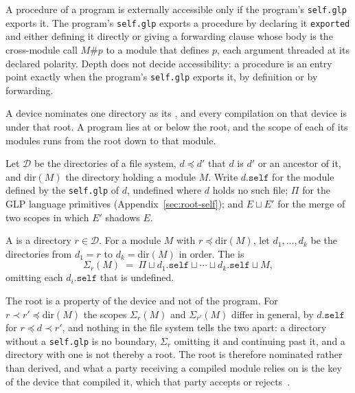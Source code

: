 A procedure of a program is externally accessible only if the program's \verb|self.glp| exports it.  The program's \verb|self.glp| exports a procedure by declaring it \verb|exported| and either defining it directly or giving a forwarding clause whose body is the cross-module call $M\#p$ to a module that defines $p$, each argument threaded at its declared polarity.  Depth does not decide accessibility: a procedure is an entry point exactly when the program's \verb|self.glp| exports it, by definition or by forwarding.

A device nominates one directory as its , and every compilation on that device is under that root.  A program lies at or below the root, and the scope of each of its modules runs from the root down to that module.

\begin{definition}
\label{def:scope}
Let $\mathcal{D}$ be the directories of a file system, $d \preceq d'$ that $d$ is $d'$ or an ancestor of it, and $\mathrm{dir}(M)$ the directory holding a module $M$.  Write $d.\mathtt{self}$ for the module defined by the \verb|self.glp| of $d$, undefined where $d$ holds no such file; $\Pi$ for the GLP language primitives (Appendix~\ref{sec:root-self}); and $E \sqcup E'$ for the merge of two scopes in which $E'$ shadows $E$.

A  is a directory $r \in \mathcal{D}$.  For a module $M$ with $r \preceq \mathrm{dir}(M)$, let $d_1,\ldots,d_k$ be the directories from $d_1 = r$ to $d_k = \mathrm{dir}(M)$ in order.  The  is
\[
  \Sigma_r(M) \;=\; \Pi \sqcup d_1.\mathtt{self} \sqcup \cdots \sqcup d_k.\mathtt{self} \sqcup M,
\]
omitting each $d_i.\mathtt{self}$ that is undefined.
\end{definition}

The root is a property of the device and not of the program.  For $r \prec r' \preceq \mathrm{dir}(M)$ the scopes $\Sigma_r(M)$ and $\Sigma_{r'}(M)$ differ in general, by $d.\mathtt{self}$ for $r \preceq d \prec r'$, and nothing in the file system tells the two apart: a directory without a \verb|self.glp| is no boundary, $\Sigma_r$ omitting it and continuing past it, and a directory with one is not thereby a root.  The root is therefore nominated rather than derived, and what a party receiving a compiled module relies on is the key of the device that compiled it, which that party accepts or rejects~\cite{shapiro2025glp}.

